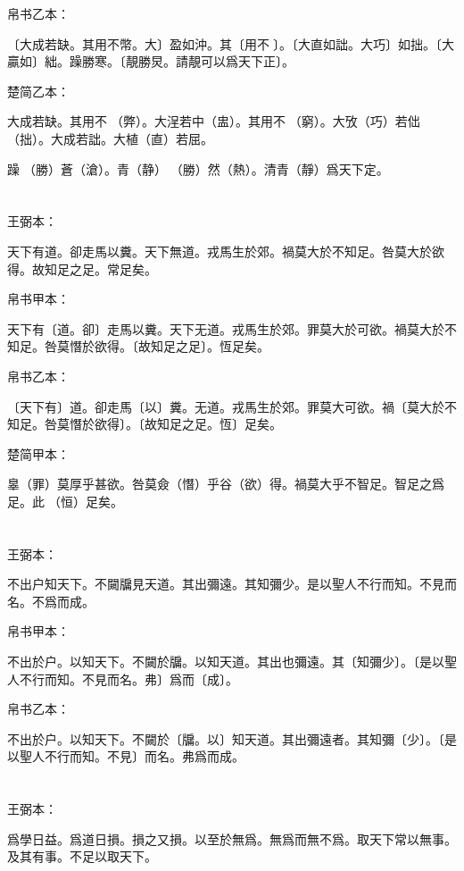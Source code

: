 \documentclass[a5paper]{ctexbook}
\begin{document}
    帛书乙本：

    〔大成若缺。其用不幣。大〕盈如沖。其〔用不𡩫〕。〔大直如詘。大巧〕如拙。〔大贏如〕絀。躁勝寒。〔靚勝炅。請靚可以爲天下正〕。

    楚简乙本：

    大成若缺。其用不󶵢（弊）。大浧若中（盅）。其用不󶵣（窮）。大攷（巧）若㑁（拙）。大成若詘。大植（直）若屈。

    躁󼡲（勝）蒼（滄）。青（静）󼡲（勝）然（熱）。清青（靜）爲天下定。

    \chapter{}
    王弼本：

    天下有道。卻走馬以糞。天下無道。戎馬生於郊。禍莫大於不知足。咎莫大於欲得。故知足之足。常足矣。

    
    帛书甲本：

    天下有〔道。卻〕走馬以糞。天下无道。戎馬生於郊。罪莫大於可欲。禍莫大於不知足。咎莫憯於欲得。〔故知足之足〕。恆足矣。

    帛书乙本：

    〔天下有〕道。卻走馬〔以〕糞。无道。戎馬生於郊。罪莫大可欲。禍〔莫大於不知足。咎莫憯於欲得〕。〔故知足之足。恆〕足矣。

    楚简甲本：

    辠（罪）莫厚乎甚欲。咎莫僉（憯）乎谷（欲）得。禍莫大乎不智足。智足之爲足。此𠄨（恒）足矣。

    \chapter{}
    王弼本：

    不出户知天下。不闚牖見天道。其出彌遠。其知彌少。是以聖人不行而知。不見而名。不爲而成。

    
    帛书甲本：

    不出於户。以知天下。不闚於牖。以知天道。其出也彌遠。其〔知彌少〕。〔是以聖人不行而知。不見而名。弗〕爲而〔成〕。

    帛书乙本：

    不出於户。以知天下。不闚於〔牖。以〕知天道。其出彌遠者。其知彌〔少〕。〔是以聖人不行而知。不見〕而名。弗爲而成。

    \chapter{}
    王弼本：

    爲學日益。爲道日損。損之又損。以至於無爲。無爲而無不爲。取天下常以無事。及其有事。不足以取天下。
\end{document}
